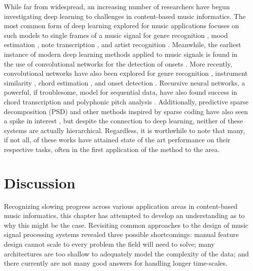 While far from widespread, an increasing number of researchers have begun investigating deep learning to challenges in content-based music informatics.
The most common form of deep learning explored for music applications focuses on such models to single frames of a music signal for genre recognition \cite{Hamel2009}, mood estimation \cite{Schmidt2011}, note transcription \cite{Nam2011}, and artist recognition \cite{Dieleman2011}.
Meanwhile, the earliest instance of modern deep learning methods applied to music signals is found in the use of convolutional networks for the detection of onsets \cite{Lacoste2007}.
More recently, convolutional networks have also been explored for genre recognition \cite{Li2010}, instrument similarity \cite{Humphrey2010}, chord estimation \cite{Humphrey2011, Humphrey2012b}, and onset detection \cite{Schluter2014}.
Recursive neural networks, a powerful, if troublesome, model for sequential data, have also found success in chord transcription \cite{Boulanger2013} and polyphonic pitch analysis \cite{Sigtia2014}.
Additionally, predictive sparse decomposition (PSD) and other methods inspired by sparse coding have also seen a spike in interest \cite{Henaff2011, Nam2012}, but despite the connection to deep learning, neither of these systems are actually hierarchical.
Regardless, it is worthwhile to note that many, if not all, of these works have attained state of the art performance on their respective tasks, often in the first application of the method to the area.



\section{Discussion}
\label{sec:discussion}

Recognizing slowing progress across various application areas in content-based music informatics, this chapter has attempted to develop an understanding as to why this might be the case.
Revisiting common approaches to the design of music signal processing systems revealed three possible shortcomings:
manual feature design cannot scale to every problem the field will need to solve;
many architectures are too shallow to adequately model the complexity of the data;
and there currently are not many good answers for handling longer time-scales.

